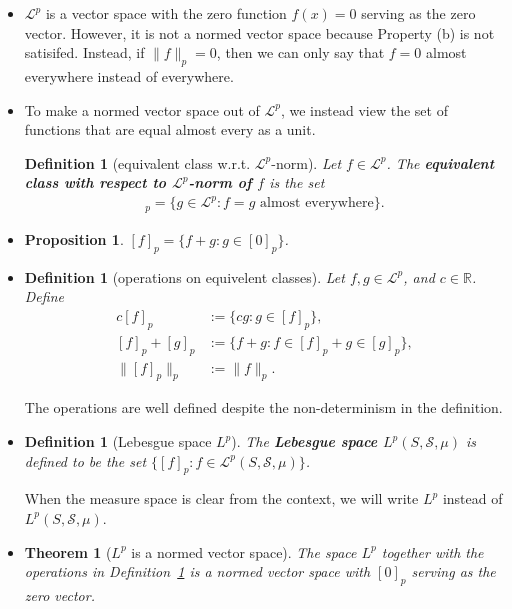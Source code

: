 \documentclass[10pt]{article}
\newtheorem{theorem}[lemma]{Theorem}
\newtheorem{definition}[lemma]{Definition}
\newtheorem{proposition}[lemma]{Proposition}
\numberwithin{lemma}{section}
\newcommand{\mcal}[1]{\mathcal{#1}}
\newcommand{\Real}{\mathbb{R}}
\begin{document}
\begin{itemize}
  \item $\mcal{L}^p$ is a vector space with the zero function $f(x) = 0$ serving as the zero vector. However, it is not a normed vector space because Property (b) is not satisifed. Instead, if $\| f \|_p = 0$, then we can only say that $f = 0$ almost everywhere instead of everywhere.
  
  \item To make a normed vector space out of $\mcal{L}^p$, we instead view the set of functions that are equal almost every as a unit.
  \begin{definition}[equivalent class w.r.t. $\mcal{L}^p$-norm]
    Let $f \in \mcal{L}^p$. The {\bf equivalent class with respect to $\mcal{L}^p$-norm of $f$} is the set
    \begin{align*}
      [f]_p = \{ g \in \mcal{L}^p : f = g \mbox{ almost everywhere}\}.
    \end{align*}
  \end{definition}

  \item \begin{proposition}
    $[f]_p = \{ f + g : g \in [0]_p \}$.
  \end{proposition}

  \item \begin{definition}[operations on equivelent classes] \label{def:equiv-class-operations}
    Let $f,g \in \mcal{L}^p$, and $c \in \Real$. Define
    \begin{align*}
      c[f]_p &:= \{ c g : g \in [f]_p \}, \\
      [f]_p + [g]_p &:= \{ f+g : f\in [f]_p + g \in [g]_p \}, \\
      \| [f]_p \|_p &:= \| f \|_p.
    \end{align*} 
  \end{definition}
  The operations are well defined despite the non-determinism in the definition.

  \item \begin{definition}[Lebesgue space $L^p$]
    The {\bf Lebesgue space $L^p(S,\mcal{S},\mu)$} is defined to be the set $\{ [f]_p : f \in \mcal{L}^p(S, \mcal{S}, \mu) \}$. 
  \end{definition}
  When the measure space is clear from the context, we will write $L^p$ instead of $L^p(S,\mcal{S},\mu)$.

  \item \begin{theorem}[$L^p$ is a normed vector space]
    The space $L^p$ together with the operations in Definition~\ref{def:equiv-class-operations} is a normed vector space with $[0]_p$ serving as the zero vector.
  \end{theorem}


\end{itemize}
\end{document}
